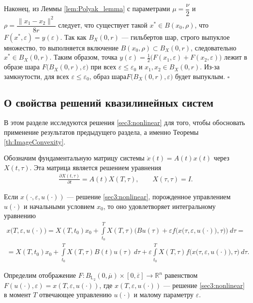 \documentclass[../main.tex]{subfiles}
\begin{document}
Наконец, из Леммы \ref{lem:Polyak_lemma} с параметрами $\mu=\dfrac{\nu}{2}$ и $\rho=\dfrac{\|x_1-x_2\|^2}{8r}$ следует, что существует такой $x^*\in B(x_0, \rho)$, что $F(x^*,\varepsilon) = y(\varepsilon)$.
Так как $B_X(0, r)$ --- гильбертов шар, строго выпуклое множество, то выполняется включение $B(x_0, \rho) \subset B_X(0, r)$, следовательно $x^* \in B_X(0, r)$. Таким образом, точка $y(\varepsilon) = \frac{1}{2} \big( F(x_1,\varepsilon) + F(x_2,\varepsilon)\big)$ лежит в образе шара $F\big(B_X(0,r),\varepsilon\big) $  при  всех  $\varepsilon \leqslant \varepsilon_0$ и $x_1, x_2 \in B_X(0,r)$. Из-за замкнутости, для всех $\varepsilon \leqslant \varepsilon_0$, образ шара$F\big(B_X(0,r),\varepsilon\big) $ будет выпуклым.
\hfill$\square$\\[1ex]%

\subsection{О свойства решений квазилинейных систем}
\setcounter{equation}{0}


В этом разделе исследуются решения \eqref{sec3:nonlinear} для того, чтобы обосновать применение результатов предыдущего раздела, а именно Теоремы \ref{th:ImageConvexity}. 

Обозначим фундаментальную матрицу системы $\dot{x}(t) = A(t) x(t)$ через $X(t,\tau)$.
Эта матрица является решением уравнения
\begin{gather*}
	\frac{\partial X(t,\tau)}{\partial t} = A(t) X(T,\tau), \qquad X(\tau,\tau) = I.
\end{gather*}

Если $x(\cdot,\varepsilon, u(\cdot))$ --- решение \eqref{sec3:nonlinear}, порожденное управлением $u(\cdot)$ и начальными условием $x_0$,  то оно удовлетворяет интегральному уравнению
\begin{gather*}
	x\big(T,\varepsilon, u(\cdot)\big) =
	X(T,t_0)x_0 + 
	\int\limits_{t_0}^T X(T,\tau) \bigg(Bu(\tau) +
	\varepsilon f\Big(x\big(\tau,\varepsilon, u(\cdot)\big),\tau\Big) \bigg)\ d\tau = \\ =
	X(T,t_0)x_0 +
	\int\limits_{t_0}^T X(T,\tau) B(t)u(\tau)\ d\tau 
	+ \varepsilon \int\limits_{t_0}^T X(T,\tau) f\Big(x\big(\tau,\varepsilon, u(\cdot)\big),\tau\Big) \ d\tau.
\end{gather*}

Определим отображение $F:B_{\mathbb{L}_2}(0,\overline{\mu})\times [0,\overline{\varepsilon}] \to \mathbb{R}^n$ равенством $F(u(\cdot),\varepsilon) = x(T,\varepsilon,u(\cdot))$, где $x(T,\varepsilon,u(\cdot))$ --- решение \eqref{sec3:nonlinear} в момент $T$ отвечающее управлению $u(\cdot)$ и малому параметру $\varepsilon$.
\end{document}

